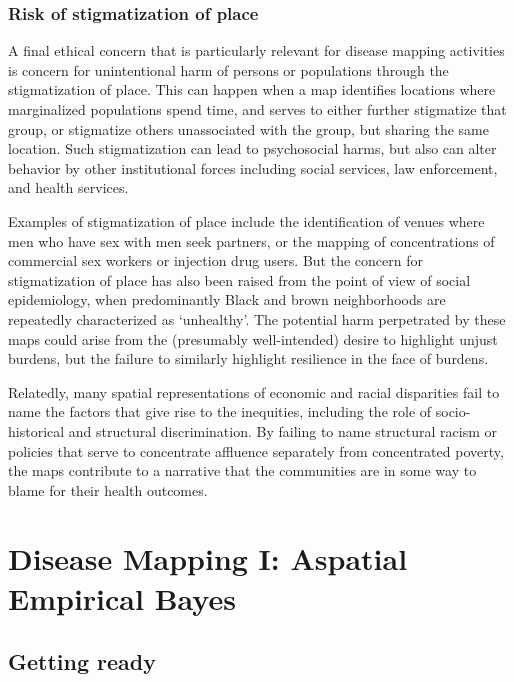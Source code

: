 \documentclass[
]{book}
\begin{document}
\hypertarget{risk-of-stigmatization-of-place}{%
\subsection{Risk of stigmatization of place}\label{risk-of-stigmatization-of-place}}

A final ethical concern that is particularly relevant for disease mapping activities is concern for unintentional harm of persons or populations through the stigmatization of place. This can happen when a map identifies locations where marginalized populations spend time, and serves to either further stigmatize that group, or stigmatize others unassociated with the group, but sharing the same location. Such stigmatization can lead to psychosocial harms, but also can alter behavior by other institutional forces including social services, law enforcement, and health services.

Examples of stigmatization of place include the identification of venues where men who have sex with men seek partners, or the mapping of concentrations of commercial sex workers or injection drug users. But the concern for stigmatization of place has also been raised from the point of view of social epidemiology, when predominantly Black and brown neighborhoods are repeatedly characterized as `unhealthy'. The potential harm perpetrated by these maps could arise from the (presumably well-intended) desire to highlight unjust burdens, but the failure to similarly highlight resilience in the face of burdens.

Relatedly, many spatial representations of economic and racial disparities fail to name the factors that give rise to the inequities, including the role of socio-historical and structural discrimination. By failing to name structural racism or policies that serve to concentrate affluence separately from concentrated poverty, the maps contribute to a narrative that the communities are in some way to blame for their health outcomes.

\hypertarget{disease-mapping-i-aspatial-empirical-bayes}{%
\chapter{Disease Mapping I: Aspatial Empirical Bayes}\label{disease-mapping-i-aspatial-empirical-bayes}}

\hypertarget{getting-ready-2}{%
\section{Getting ready}\label{getting-ready-2}}
\end{document}
